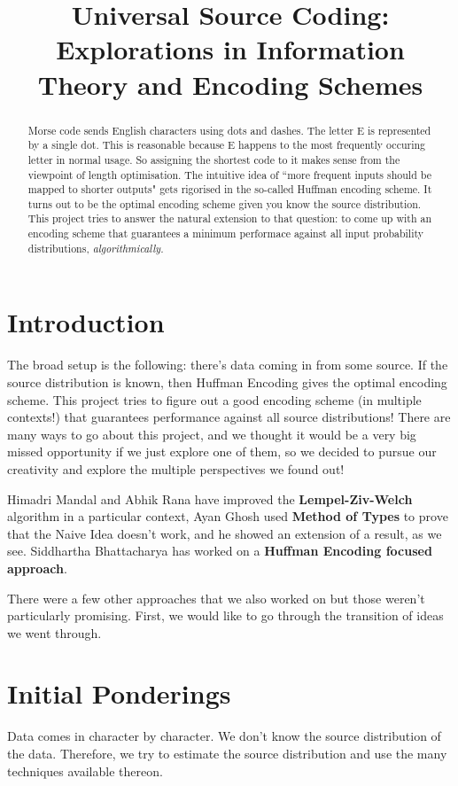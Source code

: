 \documentclass[scrartcl]{article}
\date{}
\author{}
\title{Universal Source Coding: Explorations in Information Theory and Encoding Schemes}
\begin{document}

\pagestyle{fancy}
\maketitle
\author{}
\date{}
\begin{abstract}
    Morse code sends English characters using dots and dashes. The letter E is represented by a single dot. This is reasonable because E happens to the most frequently occuring letter in normal usage. So assigning the shortest code to it makes sense from the viewpoint of length optimisation. 
    The intuitive idea of ``more frequent inputs should be mapped to shorter outputs" gets rigorised in the so-called Huffman encoding scheme. It turns out to be the optimal encoding scheme given you know the source distribution. This project tries to answer the natural extension to that question: to come up with an encoding scheme that guarantees a minimum performace against all input probability distributions, \textit{algorithmically.}
\end{abstract}
\section{Introduction}
The broad setup is the following: there's data coming in from some source. If the source distribution is known, then Huffman Encoding gives the optimal encoding scheme. This project tries to figure out a good encoding scheme (in multiple contexts!) that guarantees performance against all source distributions!
There are many ways to go about this project, and we thought it would be a very big missed opportunity if we just explore one of them, so we decided to pursue our creativity and explore the multiple perspectives we found out!

Himadri Mandal and Abhik Rana have improved the \textbf{Lempel-Ziv-Welch} algorithm in a particular context, Ayan Ghosh used \textbf{Method of Types} to prove that the Naive Idea doesn't work, and he showed an extension of a result, as we see. Siddhartha Bhattacharya has worked on a \textbf{Huffman Encoding focused approach}. 

There were a few other approaches that we also worked on but those weren't particularly promising. First, we would like to go through the transition of ideas we went through. 

\section {Initial Ponderings}
\begin{context}
Data comes in character by character. We don't know the source distribution of the data. Therefore, we try to estimate the source distribution and use the many techniques available thereon.
\end{context}
\end{document}
